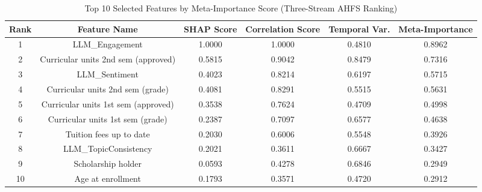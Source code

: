 \documentclass[journal]{IEEEtran}
\begin{document}
\begin{table}[t]
\centering
\caption{Top 10 Selected Features by Meta-Importance Score (Three-Stream AHFS Ranking)}
\label{tab:feature_selection}
\small
\begin{tabular}{cccccc}
\toprule
\textbf{Rank} & \textbf{Feature Name} & \textbf{SHAP Score} & \textbf{Correlation Score} & \textbf{Temporal Var.} & \textbf{Meta-Importance} \\
\midrule
1 & LLM\_Engagement & 1.0000 & 1.0000 & 0.4810 & 0.8962 \\
2 & Curricular units 2nd sem (approved) & 0.5815 & 0.9042 & 0.8479 & 0.7316 \\
3 & LLM\_Sentiment & 0.4023 & 0.8214 & 0.6197 & 0.5715 \\
4 & Curricular units 2nd sem (grade) & 0.4081 & 0.8291 & 0.5515 & 0.5631 \\
5 & Curricular units 1st sem (approved) & 0.3538 & 0.7624 & 0.4709 & 0.4998 \\
6 & Curricular units 1st sem (grade) & 0.2387 & 0.7097 & 0.6577 & 0.4638 \\
7 & Tuition fees up to date & 0.2030 & 0.6006 & 0.5548 & 0.3926 \\
8 & LLM\_TopicConsistency & 0.2021 & 0.3611 & 0.6667 & 0.3427 \\
9 & Scholarship holder & 0.0593 & 0.4278 & 0.6846 & 0.2949 \\
10 & Age at enrollment & 0.1793 & 0.3571 & 0.4720 & 0.2912 \\
\bottomrule
\end{tabular}
\end{table}
\end{document}
